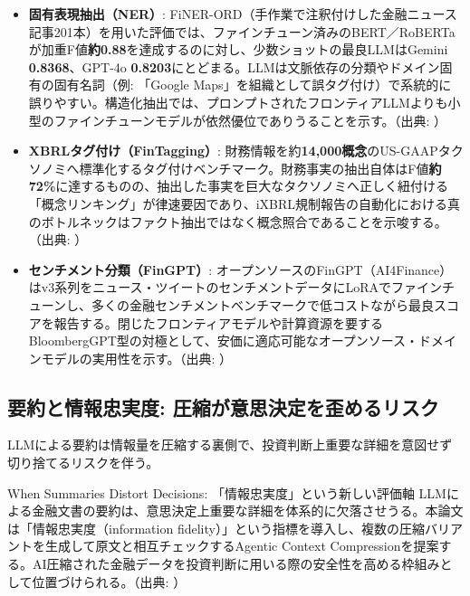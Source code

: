 \begin{itemize}
  \item \textbf{固有表現抽出（NER）}: FiNER-ORD（手作業で注釈付けした金融ニュース記事201本）を用いた評価では、ファインチューン済みのBERT／RoBERTaが加重F値\textbf{約0.88}を達成するのに対し、少数ショットの最良LLMはGemini \textbf{0.8368}、GPT-4o \textbf{0.8203}にとどまる。LLMは文脈依存の分類やドメイン固有の固有名詞（例: 「Google Maps」を組織として誤タグ付け）で系統的に誤りやすい。構造化抽出では、プロンプトされたフロンティアLLMよりも小型のファインチューンモデルが依然優位でありうることを示す。（出典: \cite{x05finerord2025}）
  \item \textbf{XBRLタグ付け（FinTagging）}: 財務情報を約\textbf{14,000概念}のUS-GAAPタクソノミへ標準化するタグ付けベンチマーク。財務事実の抽出自体はF値\textbf{約72\%}に達するものの、抽出した事実を巨大なタクソノミへ正しく紐付ける「概念リンキング」が律速要因であり、iXBRL規制報告の自動化における真のボトルネックはファクト抽出ではなく概念照合であることを示唆する。（出典: \cite{x05fintagging2025}）
  \item \textbf{センチメント分類（FinGPT）}: オープンソースのFinGPT（AI4Finance）はv3系列をニュース・ツイートのセンチメントデータにLoRAでファインチューンし、多くの金融センチメントベンチマークで低コストながら最良スコアを報告する。閉じたフロンティアモデルや計算資源を要するBloombergGPT型の対極として、安価に適応可能なオープンソース・ドメインモデルの実用性を示す。（出典: \cite{x05fingpt2023}）
\end{itemize}

\subsection{要約と情報忠実度: 圧縮が意思決定を歪めるリスク}

LLMによる要約は情報量を圧縮する裏側で、投資判断上重要な詳細を意図せず切り捨てるリスクを伴う。

\begin{casestudy}{When Summaries Distort Decisions: 「情報忠実度」という新しい評価軸}
LLMによる金融文書の要約は、意思決定上重要な詳細を体系的に欠落させうる。本論文は「情報忠実度（information fidelity）」という指標を導入し、複数の圧縮バリアントを生成して原文と相互チェックするAgentic Context Compressionを提案する。AI圧縮された金融データを投資判断に用いる際の安全性を高める枠組みとして位置づけられる。（出典: \cite{summariesdistort2026}）
\end{casestudy}

